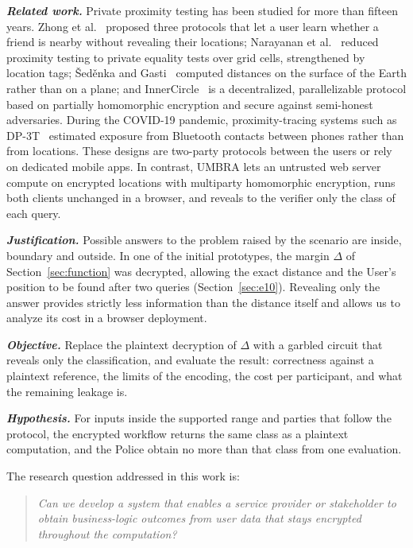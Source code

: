 \documentclass[conference,letterpaper]{IEEEtran}
\begin{document}
\textbf{\textit{Related work.}} Private proximity testing has been studied for more than fifteen years. Zhong et al.~\cite{zhong07} proposed three protocols that let a user learn whether a friend is nearby without revealing their locations; Narayanan et al.~\cite{narayanan11} reduced proximity testing to private equality tests over grid cells, strengthened by location tags; \v{S}ed\v{e}nka and Gasti~\cite{sedenka14} computed distances on the surface of the Earth rather than on a plane; and InnerCircle~\cite{hallgren15} is a decentralized, parallelizable protocol based on partially homomorphic encryption and secure against semi-honest adversaries. During the COVID-19 pandemic, proximity-tracing systems such as DP-3T~\cite{dp3t} estimated exposure from Bluetooth contacts between phones rather than from locations. These designs are two-party protocols between the users or rely on dedicated mobile apps. In contrast, UMBRA lets an untrusted web server compute on encrypted locations with multiparty homomorphic encryption, runs both clients unchanged in a browser, and reveals to the verifier only the class of each query.

\textbf{\textit{Justification.}} Possible answers to the problem raised by the scenario are inside, boundary and outside. In one of the initial prototypes, the margin $\Delta$ of Section~\ref{sec:function} was decrypted, allowing the exact distance and the User's position to be found after two queries (Section~\ref{sec:e10}). Revealing only the answer provides strictly less information than the distance itself and allows us to analyze its cost in a browser deployment.

\textbf{\textit{Objective.}} Replace the plaintext decryption of $\Delta$ with a garbled circuit that reveals only the classification, and evaluate the result: correctness against a plaintext reference, the limits of the encoding, the cost per participant, and what the remaining leakage is.

\textbf{\textit{Hypothesis.}} For inputs inside the supported range and parties that follow the protocol, the encrypted workflow returns the same class as a plaintext computation, and the Police obtain no more than that class from one evaluation.

The research question addressed in this work is:
\begin{quote}
\textit{Can we develop a system that enables a service provider or stakeholder to obtain business-logic outcomes from user data that stays encrypted throughout the computation?}
\end{quote}
\end{document}
